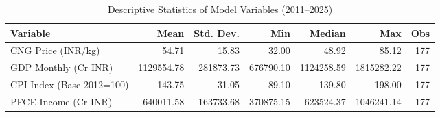 \begin{table}[htbp]
\centering
\caption{Descriptive Statistics of Model Variables (2011–2025)}
\label{tab:descriptives}
\begin{tabular}{lrrrrrr}
\toprule
Variable & Mean & Std. Dev. & Min & Median & Max & Obs \\
\midrule
CNG Price (INR/kg) & 54.71 & 15.83 & 32.00 & 48.92 & 85.12 & 177 \\
GDP Monthly (Cr INR) & 1129554.78 & 281873.73 & 676790.10 & 1124258.59 & 1815282.22 & 177 \\
CPI Index (Base 2012=100) & 143.75 & 31.05 & 89.10 & 139.80 & 198.00 & 177 \\
PFCE Income (Cr INR) & 640011.58 & 163733.68 & 370875.15 & 623524.37 & 1046241.14 & 177 \\
\bottomrule
\end{tabular}
\end{table}